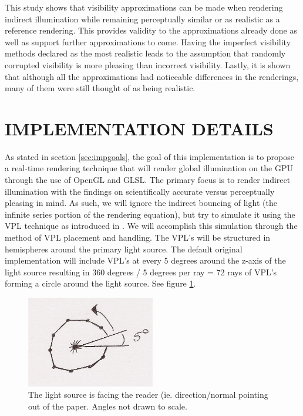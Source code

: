This study shows that visibility approximations can be made when rendering indirect illumination while remaining perceptually similar or as realistic as a reference rendering.  This provides validity to the approximations already done as well as support further approximations to come.  Having the imperfect visibility methods declared as the most realistic leads to the assumption that randomly corrupted visibility is more pleasing than incorrect visibility.  Lastly, it is shown that although all the approximations had noticeable differences in the renderings, many of them were still thought of as being realistic.

\section{IMPLEMENTATION DETAILS} \label{sec:impdetails}

As stated in section \ref{sec:impgoals}, the goal of this implementation is to propose a real-time rendering technique that will render global illumination on the GPU through the use of OpenGL and GLSL.  The primary focus is to render indirect illumination with the findings on scientifically accurate versus perceptually pleasing in mind.  As such, we will ignore the indirect bouncing of light (the infinite series portion of the rendering equation), but try to simulate it using the VPL technique as introduced in \cite{Keller1997}.  We will accomplish this simulation through the method of VPL placement and handling.  The VPL's will be structured in hemispheres around the primary light source.  The default original implementation will include VPL's at every $5$ degrees around the z-axis of the light source resulting in 360 degrees / 5 degrees per ray = 72 rays of VPL's forming a circle around the light source. See figure \ref{fig:3.1}.

\begin{figure}[h!]
  \centering
    \includegraphics[width=0.5\textwidth]{Figure31.jpg}
  \caption{The light source is facing the reader (ie. direction/normal pointing out of the paper. Angles not drawn to scale.}
	\label{fig:3.1}
\end{figure}


